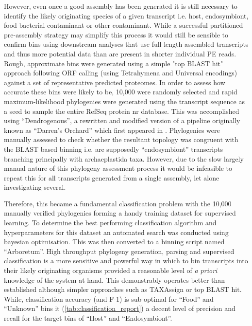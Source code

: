 However, even once a good assembly has been generated it is still necessary to identify the likely
originating species of a given transcript i.e. host, endosymbiont, food bacterial contaminant or other
contaminant.  While a successful partitioned pre-assembly strategy may simplify this process it would still
be sensible to confirm bins using downstream analyses that use full length assembled transcripts and thus
more potential data than are present in shorter individual PE reads.  Rough, approximate bins were
generated using a simple "top BLAST hit" approach following ORF calling (using Tetrahymena and Universal
encodings) against a set of representative predicted proteomes.  In order to assess how accurate these
bins were likely to be, 10,000 were randomly selected and rapid maximum-likelihood phylogenies were
generated using the transcript sequence as a seed to sample the entire RefSeq protein nr database.
This was accomplished using ``Dendrogenous'', a rewritten and modified version of a pipeline originally known 
as ``Darren's Orchard'' which first appeared in \citep{Richards2009g}.  Phylogenies were manually assessed to check
whether the resultant topology was congruent with the BLAST based binning i.e. are supposedly ``endosymbiont''
transcripts branching principally with archaeplastida taxa.  
However, due to the slow largely manual nature of this phylogeny assessment process it would be infeasible
to repeat this for all transcripts generated from a single assembly, let alone investigating several. 

Therefore, this became a fundamental classification problem with the 10,000 manually verified phylogenies
forming a handy training dataset for supervised learning.   To determine the best performing
classification algorithm and hyperparameters for this dataset an automated search was conducted 
using bayesian optimisation.  This was then converted to a binning script named ``Arboretum''.
High throughput phylogeny generation, parsing and supervised classification is 
a more sensitive and powerful way in which to bin transcripts into their likely originating
organisms provided a reasonable level of \textit{a priori} knowledge of the system at hand.
This demonstrably operates better than established although simpler approaches such as
TAXAssign or top BLAST hit.  While, classification accuracy (and F-1) is sub-optimal 
for ``Food'' and ``Unknown'' bins it (\cref{tab:classification_report}) a decent level of 
precision and recall for the target bins of ``Host'' and ``Endosymbiont''.


